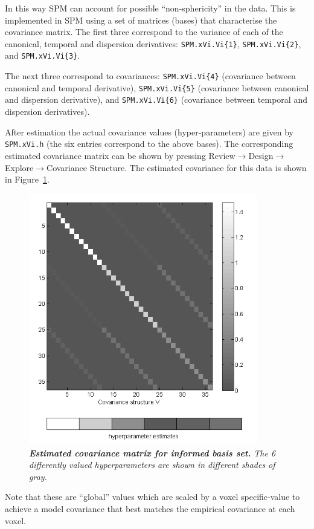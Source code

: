 In this way SPM can account for possible ``non-sphericity'' in the data. This is implemented in SPM using a set of matrices (bases) that characterise the covariance matrix. The first three correspond to the variance of each of the canonical, temporal and dispersion derivatives:  \texttt{SPM.xVi.Vi\{1\}}, \texttt{SPM.xVi.Vi\{2\}}, and \texttt{SPM.xVi.Vi\{3\}}.

The next three correspond to covariances: \texttt{SPM.xVi.Vi\{4\}} (covariance between canonical and temporal derivative), \texttt{SPM.xVi.Vi\{5\}} (covariance between canonical and dispersion derivative), and \texttt{SPM.xVi.Vi\{6\}} (covariance between temporal and dispersion derivatives).

After estimation the actual covariance values (hyper-parameters) are given by \texttt{SPM.xVi.h} (the six entries correspond to the above bases). The corresponding estimated covariance matrix can be shown by pressing Review$\rightarrow$Design$\rightarrow$Explore$\rightarrow$Covariance Structure. The estimated covariance for this data is shown in Figure~\ref{informed_covariance}.
\begin{figure}
\begin{center}
\includegraphics[width=100mm]{faces_group/informed_covariance}
\caption{\em \textbf{Estimated covariance matrix for informed basis set.} The 6 differently valued hyperparameters are shown in different shades of gray. \label{informed_covariance}}
\end{center}
\end{figure}
Note that these are ``global'' values which are scaled by a voxel specific-value to achieve a model covariance that best matches the empirical covariance at each voxel. 


